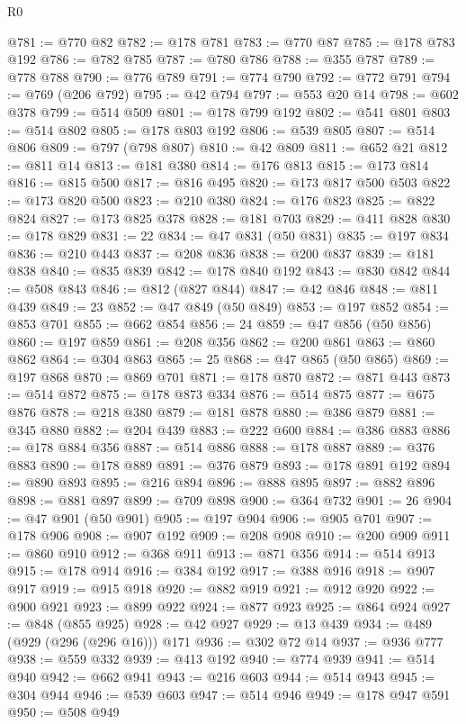 \begin{lexlean}{R0}
\begin{coremodule}
@781 := @770 @82
@782 := @178 @781
@783 := @770 @87
@785 := @178 @783 @192
@786 := @782 @785
@787 := @780 @786
@788 := @355 @787
@789 := @778 @788
@790 := @776 @789
@791 := @774 @790
@792 := @772 @791
@794 := @769 (@206 @792)
@795 := @42 @794
@797 := @553 @20 @14
@798 := @602 @378
@799 := @514 @509
@801 := @178 @799 @192
@802 := @541 @801
@803 := @514 @802
@805 := @178 @803 @192
@806 := @539 @805
@807 := @514 @806
@809 := @797 (@798 @807)
@810 := @42 @809
@811 := @652 @21
@812 := @811 @14
@813 := @181 @380
@814 := @176 @813
@815 := @173 @814
@816 := @815 @500
@817 := @816 @495
@820 := @173 @817 @500 @503
@822 := @173 @820 @500
@823 := @210 @380
@824 := @176 @823
@825 := @822 @824
@827 := @173 @825 @378
@828 := @181 @703
@829 := @411 @828
@830 := @178 @829
@831 := 22
@834 := @47 @831 (@50 @831)
@835 := @197 @834
@836 := @210 @443
@837 := @208 @836
@838 := @200 @837
@839 := @181 @838
@840 := @835 @839
@842 := @178 @840 @192
@843 := @830 @842
@844 := @508 @843
@846 := @812 (@827 @844)
@847 := @42 @846
@848 := @811 @439
@849 := 23
@852 := @47 @849 (@50 @849)
@853 := @197 @852
@854 := @853 @701
@855 := @662 @854
@856 := 24
@859 := @47 @856 (@50 @856)
@860 := @197 @859
@861 := @208 @356
@862 := @200 @861
@863 := @860 @862
@864 := @304 @863
@865 := 25
@868 := @47 @865 (@50 @865)
@869 := @197 @868
@870 := @869 @701
@871 := @178 @870
@872 := @871 @443
@873 := @514 @872
@875 := @178 @873 @334
@876 := @514 @875
@877 := @675 @876
@878 := @218 @380
@879 := @181 @878
@880 := @386 @879
@881 := @345 @880
@882 := @204 @439
@883 := @222 @600
@884 := @386 @883
@886 := @178 @884 @356
@887 := @514 @886
@888 := @178 @887
@889 := @376 @883
@890 := @178 @889
@891 := @376 @879
@893 := @178 @891 @192
@894 := @890 @893
@895 := @216 @894
@896 := @888 @895
@897 := @882 @896
@898 := @881 @897
@899 := @709 @898
@900 := @364 @732
@901 := 26
@904 := @47 @901 (@50 @901)
@905 := @197 @904
@906 := @905 @701
@907 := @178 @906
@908 := @907 @192
@909 := @208 @908
@910 := @200 @909
@911 := @860 @910
@912 := @368 @911
@913 := @871 @356
@914 := @514 @913
@915 := @178 @914
@916 := @384 @192
@917 := @388 @916
@918 := @907 @917
@919 := @915 @918
@920 := @882 @919
@921 := @912 @920
@922 := @900 @921
@923 := @899 @922
@924 := @877 @923
@925 := @864 @924
@927 := @848 (@855 @925)
@928 := @42 @927
@929 := @13 @439
@934 := @489 (@929 (@296 (@296 @16))) @171
@936 := @302 @72 @14
@937 := @936 @777
@938 := @559 @332
@939 := @413 @192
@940 := @774 @939
@941 := @514 @940
@942 := @662 @941
@943 := @216 @603
@944 := @514 @943
@945 := @304 @944
@946 := @539 @603
@947 := @514 @946
@949 := @178 @947 @591
@950 := @508 @949

\end{coremodule}
\end{lexlean}
